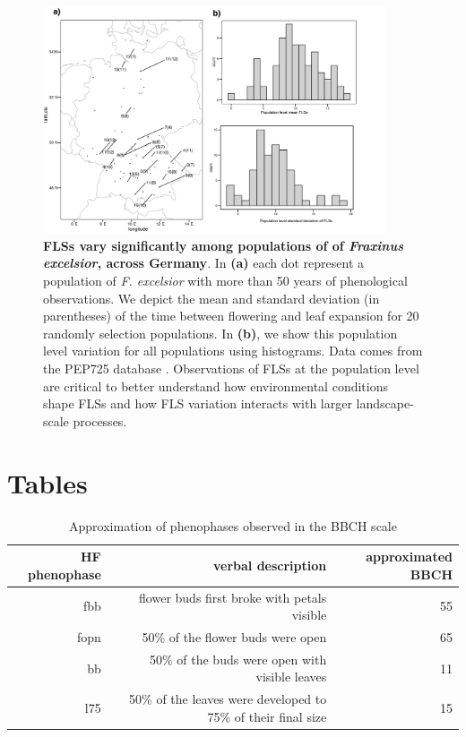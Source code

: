 \documentclass[11pt]{article}
\begin{document}
\begin{figure}[H]
\centering
\includegraphics[width=0.9\textwidth]{..//..//popmap.png} 
  \caption{\textbf{FLSs vary significantly among populations of of \emph{Fraxinus excelsior}, across Germany}. In \textbf{(a)} each dot represent a population of \emph{F. excelsior} with more than 50 years of phenological observations. We depict the mean and standard deviation (in parentheses) of the time between flowering and leaf expansion for 20 randomly selection populations. In \textbf{(b)}, we show this population level variation for all populations using histograms. Data comes from the PEP725 database \citep{PEP725}. Observations of FLSs at the population level are critical to better understand how environmental conditions shape FLSs and how FLS variation interacts with larger landscape-scale processes.}
  \label{fig:popmap}
    \end{figure}
    
\pagebreak[4]

\section*{Tables}

\begin{table}[H]
\centering
\begin{tabular}{rrr}
  \hline
  HF phenophase & verbal description & approximated BBCH  \\ 
  \hline
  fbb & flower buds first broke with petals visible & 55 \\
  fopn &  50\% of the flower buds were open & 65 \\
 bb &  50\% of the buds were open with visible leaves & 11 \\
 l75 & 50\% of the leaves were developed to 75\% of their final size &  15 \\
   \hline
\end{tabular}
\caption{Approximation of phenophases observed in \citep{OKeefe2015} the BBCH scale \citep{Finn2007}} 
\label{tab:BBCH2HF}
\end{table}
\end{document}
